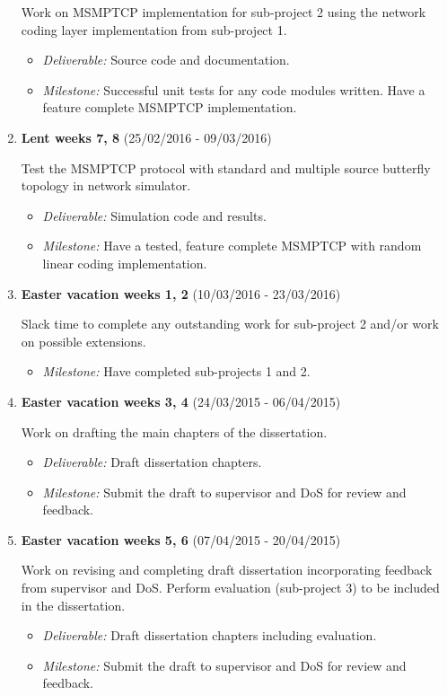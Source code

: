 \documentclass[12pt,a4paper,twoside]{article}
\begin{document}
\begin{enumerate}
Work on MSMPTCP implementation for sub-project 2 using the network coding layer implementation from sub-project 1.
\begin{itemize}
  \item {\em Deliverable:} Source code and documentation.
  \item {\em Milestone:} Successful unit tests for any code modules written. Have a feature complete MSMPTCP implementation.
\end{itemize}

\item {\bf Lent weeks 7, 8} (25/02/2016 - 09/03/2016)

Test the MSMPTCP protocol with standard and multiple source butterfly topology in network simulator.
\begin{itemize}
  \item {\em Deliverable:} Simulation code and results.
  \item {\em Milestone:} Have a tested, feature complete MSMPTCP with random linear coding implementation.
\end{itemize}

\item {\bf Easter vacation weeks 1, 2} (10/03/2016 - 23/03/2016)

Slack time to complete any outstanding work for sub-project 2 and/or work on possible extensions.
\begin{itemize}
  \item {\em Milestone:} Have completed sub-projects 1 and 2.
\end{itemize}

\item {\bf Easter vacation weeks 3, 4} (24/03/2015 - 06/04/2015)

Work on drafting the main chapters of the dissertation.
\begin{itemize}
  \item {\em Deliverable:} Draft dissertation chapters.
  \item {\em Milestone:} Submit the draft to supervisor and DoS for review and feedback.
\end{itemize}

\item {\bf Easter vacation weeks 5, 6} (07/04/2015 - 20/04/2015)

Work on revising and completing draft dissertation incorporating feedback from supervisor and DoS. Perform evaluation (sub-project 3) to be included in the dissertation.
\begin{itemize}
  \item {\em Deliverable:} Draft dissertation chapters including evaluation.
  \item {\em Milestone:} Submit the draft to supervisor and DoS for review and feedback.
\end{itemize}


\end{enumerate}
\end{document}
